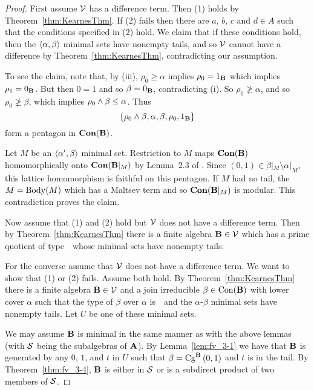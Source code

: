 \begin{proof}
First assume $\sV$ has a difference term.
Then (1) holds by Theorem~\ref{thm:KearnesThm}.
If (2) fails then there are $a$, $b$, $c$ and $d \in A$ such
that the conditions specified in (2) hold. We claim that
if these conditions hold, then the $\la \alpha, \beta \ra$
minimal sets have nonempty tails, and so $\sV$ cannot have 
a difference by Theorem~\ref{thm:KearnesThm}, contradicting
our assumption.

To see the claim, note that, by (iii), $\rho_0 \ge \alpha$ implies
$\rho_0 = 1_{\alg B}$ which implies $\rho_1 = 0_{\alg B}$. But
then $0 = 1$ and so $\beta = 0_{\alg B}$, contradicting (i).
So $\rho_0 \ngeq \alpha$, and so $\rho_0 \ngeq \beta$,
which implies $\rho_0 \meet \beta \le \alpha$. Thus
\[
\{\rho_0 \meet \beta, \alpha, \beta, \rho_0, 1_{\alg B}\}
\]
form a pentagon in $\Con(\alg B)$.

Let $M$ be an $\la \alpha',\beta \ra$ minimal set.  
Restriction to $M$ maps  $\Con (\alg B)$ homomorphically 
onto $\Con (\alg B|_M)$ by Lemma~2.3 of \cite{HM:1988}. 
Since $(0,1) \in \beta|_M\setminus \alpha|_M$, this 
lattice homomorphism is faithful on this pentagon. If 
$M$ had no tail, the $M = \body(M)$ which has a Maltsev
term and so $\Con(\alg B|_M)$ is modular. This contradiction
proves the claim.

Now assume that (1) and (2) hold but $\sV$ does not have a
difference term. Then by Theorem~\ref{thm:KearnesThm} there
is a finite algebra $\alg B \in \sV$ which has a prime 
quotient of type~\atyp\ whose minimal sets have nonempty tails.

For the converse assume that $\sV$ does not have a difference 
term. 
We want to show that (1) or (2) fails. Assume both hold.
By Theorem~\ref{thm:KearnesThm} there is a finite 
algebra $\alg B \in \sV$ and a join irreducible 
$\beta \in \op{Con}(\alg B)$ with lower cover 
$\alpha$ such that the type of $\beta$ over $\alpha$ is~\atyp\
and the $\alpha$-$\beta$ minimal sets have
nonempty tails. Let $U$ be one of these minimal sets.


We may assume $\alg B$ is minimal in the same manner as with the
above lemmas (with $\sS$ being the subalgebras of $\alg A$).
By Lemma~\ref{lem:fv_3-1} 
we have that $\alg B$ is generated by any $0$, $1$, and $t$ in
$U$ such
that $\beta = \Cga 01{B}$ and $t$ is in the tail. By 
Theorem~\ref{thm:fv_3-4}, $\alg B$ is either 
in $\sS$ or is a subdirect product of two members of $\sS$.


\end{proof}
